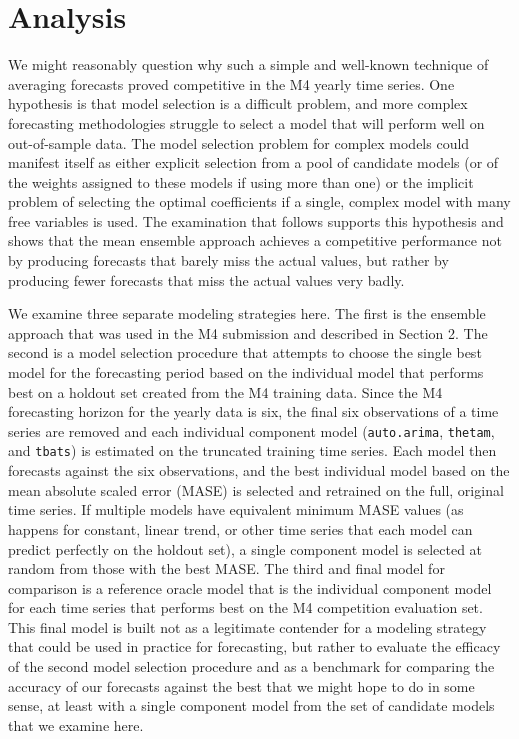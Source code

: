 \documentclass[11pt,3p,review,authoryear]{elsarticle}
\begin{document}
\section{Analysis}
We might reasonably question why such a simple and well-known technique of averaging forecasts proved competitive in the M4 yearly time series. One hypothesis is that model selection is a difficult problem, and more complex forecasting methodologies struggle to select a model that will perform well on out-of-sample data. The model selection problem for complex models could manifest itself as either explicit selection from a pool of candidate models (or of the weights assigned to these models if using more than one) or the implicit problem of selecting the optimal coefficients if a single, complex model with many free variables is used. The examination that follows supports this hypothesis and shows that the mean ensemble approach achieves a competitive performance not by producing forecasts that barely miss the actual values, but rather by producing fewer forecasts that miss the actual values very badly.


We examine three separate modeling strategies here. The first is the ensemble approach that was used in the M4 submission and described in Section 2. The second is a model selection procedure that attempts to choose the single best model for the forecasting period based on the individual model that performs best on a holdout set created from the M4 training data. Since the M4 forecasting horizon for the yearly data is six, the final six observations of a time series are removed and each individual component model (\texttt{auto.arima}, \texttt{thetam}, and \texttt{tbats}) is estimated on the truncated training time series. Each model then forecasts against the six observations, and the best individual model based on the mean absolute scaled error (MASE) is selected and retrained on the full, original time series. If multiple models have equivalent minimum MASE values (as happens for constant, linear trend, or other time series that each model can predict perfectly on the holdout set), a single component model is selected at random from those with the best MASE. The third and final model for comparison is a reference oracle model that is the individual component model for each time series that performs best on the M4 competition evaluation set. This final model is built not as a legitimate contender for a modeling strategy that could be used in practice for forecasting, but rather to evaluate the efficacy of the second model selection procedure and as a benchmark for comparing the accuracy of our forecasts against the best that we might hope to do in some sense, at least with a single component model from the set of candidate models that we examine here.
\end{document}
